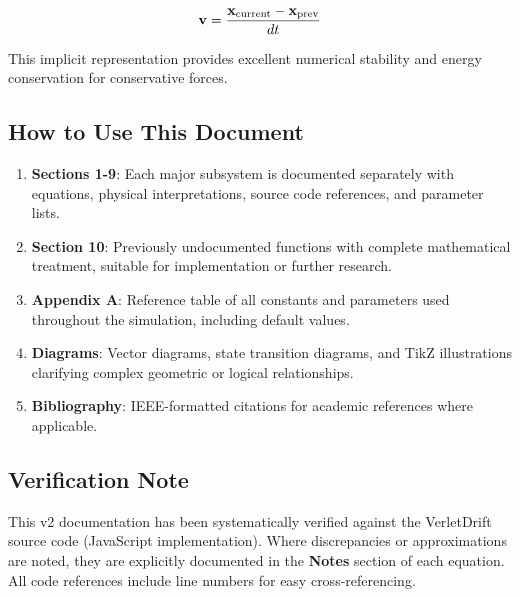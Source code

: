 \begin{equation}
  \mathbf{v} = \frac{\mathbf{x}_{\text{current}} - \mathbf{x}_{\text{prev}}}{dt}
\end{equation}

This implicit representation provides excellent numerical stability and energy conservation for conservative forces.

\subsection*{How to Use This Document}

\begin{enumerate}
  \item \textbf{Sections 1-9}: Each major subsystem is documented separately with equations, physical interpretations, source code references, and parameter lists.

  \item \textbf{Section 10}: Previously undocumented functions with complete mathematical treatment, suitable for implementation or further research.

  \item \textbf{Appendix A}: Reference table of all constants and parameters used throughout the simulation, including default values.

  \item \textbf{Diagrams}: Vector diagrams, state transition diagrams, and TikZ illustrations clarifying complex geometric or logical relationships.

  \item \textbf{Bibliography}: IEEE-formatted citations for academic references where applicable.
\end{enumerate}

\subsection*{Verification Note}

This v2 documentation has been systematically verified against the VerletDrift source code (JavaScript implementation). Where discrepancies or approximations are noted, they are explicitly documented in the \textbf{Notes} section of each equation. All code references include line numbers for easy cross-referencing.

\newpage
